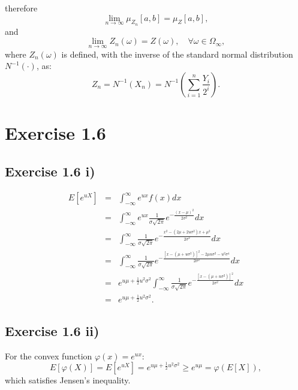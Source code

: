 \documentclass[final,3p,authoryear]{elsarticle}
\begin{document}
		therefore
		\begin{equation}
			\lim\limits_{n \to \infty} \mu_{Z_n}[a,b] = \mu_Z[a,b]
			,
		\end{equation}
		and
		\begin{equation}
			\lim\limits_{n \to \infty} Z_n(\omega) = Z(\omega),\quad \forall \omega \in \Omega_\infty
			,
		\end{equation}
		where $Z_n(\omega)$ is defined, with the inverse of the standard normal distribution $N^{-1}(\cdot)$, as:
		\begin{equation}
			Z_n=N^{-1}(X_n)=N^{-1}(\sum\limits_{i=1}^{n} \frac{Y_i}{2^i})
			.
		\end{equation}
		
\section{Exercise 1.6}
	\subsection{Exercise 1.6 i)}
		\begin{eqnarray}
			E[e^{uX}] &=& \int_{-\infty}^{\infty} e^{ux} f(x) dx
			\nonumber\\
			&=& \int_{-\infty}^{\infty} e^{ux} \frac{1}{\sigma \sqrt{2\pi}} e^{-\frac{(x-\mu)^2}{2\sigma^2}} dx
			\nonumber\\
			&=& \int_{-\infty}^{\infty} \frac{1}{\sigma \sqrt{2\pi}} e^{-\frac{x^2 - (2\mu + 2u \sigma^2)x + \mu^2}{2\sigma^2}} dx
			\nonumber\\
			&=& \int_{-\infty}^{\infty} \frac{1}{\sigma \sqrt{2\pi}} e^{-\frac{[x-(\mu + u\sigma^2)]^2 - 2\mu u \sigma^2 - u^2 \sigma^4}{2\sigma^2}} dx
			\nonumber\\
			&=& e^{u \mu + \frac{1}{2}u^2 \sigma^2} \int_{-\infty}^{\infty} \frac{1}{\sigma \sqrt{2\pi}} e^{-\frac{[x-(\mu + u\sigma^2)]^2}{2\sigma^2}} dx
			\nonumber\\
			&=& e^{u \mu + \frac{1}{2}u^2 \sigma^2}
			.
		\end{eqnarray}
	
	\subsection{Exercise 1.6 ii)}
		For the convex function $\varphi(x)=e^{ux}$:
		\begin{equation}
			E[\varphi(X)] = E[e^{uX}] = e^{u \mu + \frac{1}{2}u^2 \sigma^2} \geq e^{u\mu} = \varphi(E[X])
			,
		\end{equation}
		which satisfies Jensen's inequality.
		
\end{document}

